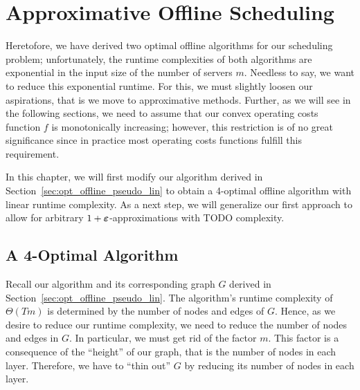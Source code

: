 
\chapter{Approximative Offline Scheduling}
Heretofore, we have derived two optimal offline algorithms for our scheduling problem; unfortunately, the runtime complexities of both algorithms are exponential in the input size of the number of servers $m$. Needless to say, we want to reduce this exponential runtime. For this, we must slightly loosen our aspirations, that is we move to approximative methods. Further, as we will see in the following sections, we need to assume that our convex operating costs function $f$ is monotonically increasing; however, this restriction is of no great significance since in practice most operating costs functions fulfill this requirement. 

In this chapter, we will first modify our algorithm derived in Section~\ref{sec:opt_offline_pseudo_lin} to obtain a 4-optimal offline algorithm with linear runtime complexity. As a next step, we will generalize our first approach to allow for arbitrary $1+\boldsymbol\varepsilon$-approximations with TODO complexity.

\section{A 4-Optimal Algorithm}
Recall our algorithm and its corresponding graph $G$ derived in Section~\ref{sec:opt_offline_pseudo_lin}. The algorithm's runtime complexity of $\Theta(Tm)$ is determined by the number of nodes and edges of $G$. Hence, as we desire to reduce our runtime complexity, we need to reduce the number of nodes and edges in $G$. In particular, we must get rid of the factor $m$. This factor is a consequence of the ``height'' of our graph, that is the number of nodes in each layer. Therefore, we have to ``thin out'' $G$ by reducing its number of nodes in each layer.

